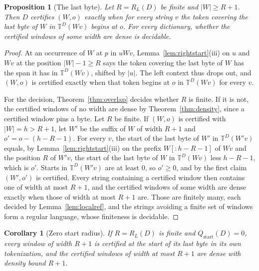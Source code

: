 \documentclass[11pt,a4paper]{article}
\theoremstyle{definition}
\theoremstyle{plain}
\newtheorem{proposition}{Proposition}
\newtheorem{corollary}{Corollary}
\newcommand{\T}{\mathbb{T}}
\newcommand{\ripple}{R_{L}}
\begin{document}
\begin{proposition}[The last byte]\label{prop:lastbyte}
Let \(R = \ripple(D)\) be finite and \(|W| \ge R + 1\). Then \(D\) certifies \((W, o)\) exactly when for every string
\(v\) the token covering the last byte of \(W\) in \(\T^D(Wv)\) begins at \(o\). For every dictionary, whether the
certified windows of some width are dense is decidable.
\end{proposition}

\begin{proof}
At an occurrence of \(W\) at \(p\) in \(uWv\), Lemma~\ref{lem:rightstart}(iii) on \(u\) and \(Wv\) at the position
\(|W| - 1 \ge R\) says the token covering the last byte of \(W\) has the span it has in \(\T^D(Wv)\), shifted by
\(|u|\). The left context thus drops out, and \((W, o)\) is certified exactly when that token begins at \(o\) in
\(\T^D(Wv)\) for every \(v\).

For the decision, Theorem~\ref{thm:overlap} decides whether \(R\) is finite. If it is not, the certified windows of no
width are dense by Theorem~\ref{thm:density}, since a certified window pins a byte. Let \(R\) be finite. If \((W, o)\)
is certified with \(|W| = h > R + 1\), let \(W'\) be the suffix of \(W\) of width \(R + 1\) and
\(o' = o - (h - R - 1)\). For every \(v\), the start of the last byte of \(W'\) in \(\T^D(W'v)\) equals, by
Lemma~\ref{lem:rightstart}(iii) on the prefix \(W[{:}h - R - 1]\) of \(Wv\) and the position \(R\) of \(W'v\), the start
of the last byte of \(W\) in \(\T^D(Wv)\) less \(h - R - 1\), which is \(o'\). Starts in \(\T^D(W'v)\) are at least
\(0\), so \(o' \ge 0\), and by the first claim \((W', o')\) is certified. Every string containing a certified window
then contains one of width at most \(R + 1\), and the certified windows of some width are dense exactly when those of
width at most \(R + 1\) are. Those are finitely many, each decided by Lemma~\ref{lem:localref}, and the strings avoiding
a finite set of windows form a regular language, whose finiteness is decidable.
\end{proof}

\begin{corollary}[Zero start radius]\label{cor:lastbyte}
If \(R = \ripple(D)\) is finite and \(Q_{\mathrm{start}}(D) = 0\), every window of width \(R + 1\) is certified at the
start of its last byte in its own tokenization, and the certified windows of width at most \(R + 1\) are dense with
density bound \(R + 1\).
\end{corollary}
\end{document}
